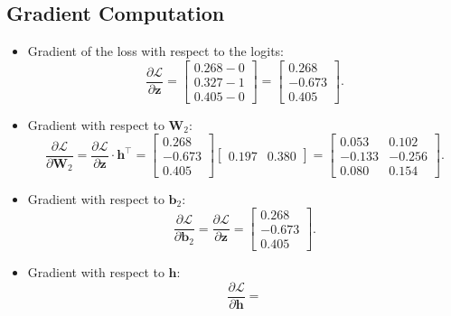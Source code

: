 \begin{notechapter}
\subsection{Gradient Computation}
\begin{itemize}
    \item Gradient of the loss with respect to the logits:
          \[
          \frac{\partial \mathcal{L}}{\partial \mathbf{z}} =
          \begin{bmatrix}
          0.268 - 0 \\
          0.327 - 1 \\
          0.405 - 0
          \end{bmatrix} =
          \begin{bmatrix}
          0.268 \\
          -0.673 \\
          0.405
          \end{bmatrix}.
          \]
    \item Gradient with respect to \(\mathbf{W}_2\):
          \[
          \frac{\partial \mathcal{L}}{\partial \mathbf{W}_2} =
          \frac{\partial \mathcal{L}}{\partial \mathbf{z}} \cdot \mathbf{h}^\top =
          \begin{bmatrix}
          0.268 \\
          -0.673 \\
          0.405
          \end{bmatrix}
          \begin{bmatrix}
          0.197 & 0.380
          \end{bmatrix} =
          \begin{bmatrix}
          0.053 & 0.102 \\
          -0.133 & -0.256 \\
          0.080 & 0.154
          \end{bmatrix}.
          \]
    \item Gradient with respect to \(\mathbf{b}_2\):
          \[
          \frac{\partial \mathcal{L}}{\partial \mathbf{b}_2} =
          \frac{\partial \mathcal{L}}{\partial \mathbf{z}} =
          \begin{bmatrix}
          0.268 \\
          -0.673 \\
          0.405
          \end{bmatrix}.
          \]
    \item Gradient with respect to \(\mathbf{h}\):
          \[
          \frac{\partial \mathcal{L}}{\partial \mathbf{h}} =
\]
\end{itemize}
\end{notechapter}
